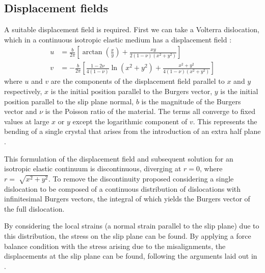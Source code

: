 \FloatBarrier














\subsection{Displacement fields}

A suitable displacement field is required. First we can take a Volterra dislocation, which in a continuous isotropic elastic medium has a displacement field \cite{Hirth1982Straight_dislocs}:
\begin{subequations}
\begin{align}
u &= \frac{b}{2\pi}\left[ \arctan\left(\frac{x}{y}\right) + \frac{xy}{2(1-\nu)(x^2 + y^2)} \right] \\[0.5ex]
v &= -\frac{b}{2\pi} \left[ \frac{1-2\nu}{4(1-\nu)} \ln(x^2 + y^2) + \frac{x^2 + y^2}{4(1-\nu)(x^2 + y^2)} \right]
\end{align}
\end{subequations}
where $u$ and $v$ are the components of the displacement field parallel to $x$ and $y$ respectively, $x$ is the initial position parallel to the Burgers vector, $y$ is the initial position parallel to the slip plane normal, $b$ is the magnitude of the Burgers vector and $\nu$ is the Poisson ratio of the material. The terms all converge to fixed values at large $x$ or $y$ except the logarithmic component of $v$. This represents the bending of a single crystal that arises from the introduction of an extra half plane \cite{Hirth1982Straight_dislocs}.

This formulation of the displacement field and subsequent solution for an isotropic elastic continuum is discontinuous, diverging at $r=0$, where $r=\sqrt[]{x^2+y^2}$. To remove the discontinuity \citet{Eshelby1949} proposed considering a single dislocation to be composed of a continuous distribution of dislocations with infinitesimal Burgers vectors, the integral of which yields the Burgers vector of the full dislocation. 

By considering the local strains (a normal strain parallel to the slip plane) due to this distribution, the stress on the slip plane can be found. By applying a force balance condition with the stress arising due to the misalignments, the displacements at the slip plane can be found, following the arguments laid out in \cite{Hirth_Lothe1982lattice_periodicity}. 

